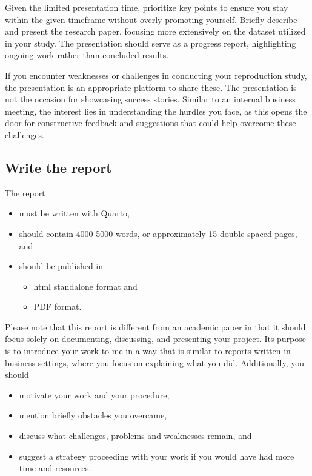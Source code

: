 \documentclass[
  a4paper,
  onecolumn,
  oneside]{scrartcl}
\providecommand{\tightlist}{%
  \setlength{\itemsep}{0pt}\setlength{\parskip}{0pt}}\usepackage{longtable,booktabs,array}
\begin{document}
Given the limited presentation time, prioritize key points to ensure you
stay within the given timeframe without overly promoting yourself.
Briefly describe and present the research paper, focusing more
extensively on the dataset utilized in your study. The presentation
should serve as a progress report, highlighting ongoing work rather than
concluded results.

If you encounter weaknesses or challenges in conducting your
reproduction study, the presentation is an appropriate platform to share
these. The presentation is not the occasion for showcasing success
stories. Similar to an internal business meeting, the interest lies in
understanding the hurdles you face, as this opens the door for
constructive feedback and suggestions that could help overcome these
challenges.

\subsection{Write the report}\label{write-the-report}

The report

\begin{itemize}
\tightlist
\item
  must be written with Quarto,
\item
  should contain 4000-5000 words, or approximately 15 double-spaced
  pages, and
\item
  should be published in

  \begin{itemize}
  \tightlist
  \item
    html standalone format and
  \item
    PDF format.
  \end{itemize}
\end{itemize}

Please note that this report is different from an academic paper in that
it should focus solely on documenting, discussing, and presenting your
project. Its purpose is to introduce your work to me in a way that is
similar to reports written in business settings, where you focus on
explaining what you did. Additionally, you should

\begin{itemize}
\tightlist
\item
  motivate your work and your procedure,
\item
  mention briefly obstacles you overcame,
\item
  discuss what challenges, problems and weaknesses remain, and
\item
  suggest a strategy proceeding with your work if you would have had
  more time and resources.
\end{itemize}
\end{document}
